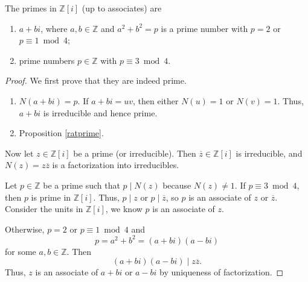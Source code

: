 \begin{theorem}
    \label{ziprime}
    The primes in \(\mathbb{Z}[i]\) (up to associates) are
    \begin{enumerate}
        \item \(a + bi\), where \(a, b \in \mathbb{Z}\) and \(a^2 + b^2 = p\) is a prime number with \(p = 2\) or \(p \equiv 1 \bmod 4\);
        \item prime numbers \(p \in \mathbb{Z}\) with \(p \equiv 3 \bmod 4\).
    \end{enumerate}
\end{theorem}
\begin{proof}
    We first prove that they are indeed prime.
    \begin{enumerate}
        \item \(N(a + bi) = p\). If \(a + bi = uv\), then either \(N(u) = 1\) or \(N(v) = 1\). Thus, \(a + bi\) is irreducible and hence prime.
        \item Proposition \eqref{ratprime}.
    \end{enumerate}
    Now let \(z \in \mathbb{Z}[i]\) be a prime (or irreducible). Then \(\overline{z} \in \mathbb{Z}[i]\) is irreducible, and \(N(z) = z \overline{z}\) is a factorization into irreducibles.

    Let \(p \in \mathbb{Z}\) be a prime such that \(p \mid N(z)\) because \(N(z) \neq 1\). If \(p \equiv 3 \bmod 4\), then \(p\) is prime in \(\mathbb{Z}[i]\). Thus, \(p \mid z\) or \(p \mid \overline{z}\), so \(p\) is an associate of \(z\) or \(\overline{z}\). Consider the units in \(\mathbb{Z}[i]\), we know \(p\) is an associate of \(z\).

    Otherwise, \(p = 2\) or \(p \equiv 1 \bmod 4\) and
    \[
        p = a^2 + b^2 = (a + bi)(a - bi)
    \]
    for some \(a, b \in \mathbb{Z}\). Then
    \[
        (a + bi)(a - bi) \mid z \overline{z}.
    \]
    Thus, \(z\) is an associate of \(a + bi\) or \(a - bi\) by uniqueness of factorization.
\end{proof}
